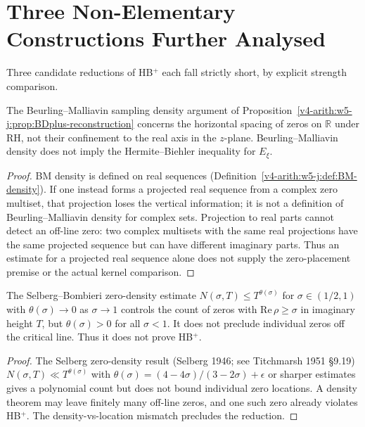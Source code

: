 \section{Three Non-Elementary Constructions Further Analysed}
\label{v4-arith:w7-c:three-constructions}

Three candidate reductions of HB\(^{+}\) each fall strictly short, by
explicit strength comparison.

\begin{proposition}
\label{v4-arith:w7-c:prop:rule-out-density-only}
The Beurling--Malliavin sampling density
argument of Proposition~\ref{v4-arith:w5-j:prop:BDplus-reconstruction}
concerns the horizontal spacing of zeros on \(\mathbb{R}\) under RH,
not their confinement to the real axis in the \(z\)-plane.
Beurling--Malliavin density does not imply the Hermite--Biehler
inequality for \(E_{\xi}\).
\end{proposition}

\begin{proof}
BM density is defined on real sequences
(Definition~\ref{v4-arith:w5-j:def:BM-density}). If one instead
forms a projected real sequence from a complex zero multiset, that
projection loses the vertical information; it is not a definition of
Beurling--Malliavin density for complex sets. Projection to real parts cannot detect an off-line zero:
two complex multisets with the same real projections have the same
projected sequence but can have different imaginary parts. Thus
an estimate for a projected real sequence alone does not supply
the zero-placement premise or the actual kernel comparison.
\end{proof}

\begin{proposition}
\label{v4-arith:w7-c:prop:rule-out-polynomial}
The Selberg--Bombieri zero-density estimate
\(N(\sigma,T)\leq T^{\theta(\sigma)}\) for \(\sigma\in(1/2,1)\)
with \(\theta(\sigma)\to 0\) as \(\sigma\to 1\) controls the
count of zeros with \(\mathrm{Re}\,\rho\geq\sigma\) in imaginary height
\(T\), but \(\theta(\sigma)>0\) for all \(\sigma<1\). It does not
preclude individual zeros off the critical line. Thus it does not
prove HB\(^{+}\).
\end{proposition}

\begin{proof}
The Selberg zero-density result (Selberg 1946; see Titchmarsh 1951
\S9.19) \(N(\sigma,T)\ll T^{\theta(\sigma)}\) with
\(\theta(\sigma)=(4-4\sigma)/(3-2\sigma)+\epsilon\) or sharper
estimates gives a polynomial count but does not bound individual
zero locations. A density theorem may leave finitely many off-line
zeros, and one such zero already violates HB\(^{+}\). The
density-vs-location mismatch precludes the reduction.
\end{proof}

